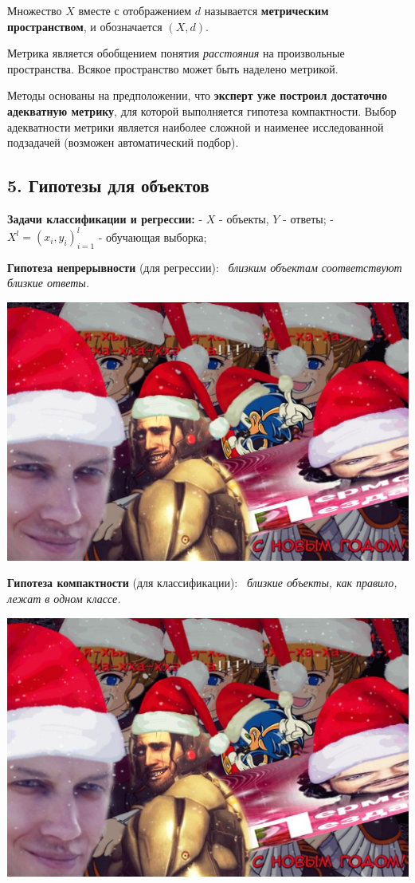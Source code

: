 Множество $X$ вместе с отображением $d$ называется
\textbf{метрическим пространством}, и обозначается $(X, d)$.

Метрика является обобщением понятия \textit{расстояния} на произвольные
пространства.
Всякое пространство может быть наделено метрикой.

Методы основаны на предположении, что \textbf{эксперт уже построил достаточно
адекватную метрику}, для которой выполняется гипотеза компактности.
Выбор адекватности метрики является наиболее сложной и наименее
исследованной подзадачей (возможен автоматический подбор).

\subsection{5. Гипотезы для объектов}

\textbf{Задачи классификации и регрессии:}
- $X$ - объекты, $Y$ - ответы;
- $X^l = {(x_i, y_i)}^l_{i=1}$ - обучающая выборка;

\textbf{Гипотеза непрерывности} (для регрессии):
\
\textit{близким объектам соответствуют близкие ответы.}

\includegraphics[scale=0.3]{figures/samplefigure.jpg}

\textbf{Гипотеза компактности} (для классификации):
\
\textit{близкие объекты, как правило, лежат в одном классе.}

\includegraphics[scale=0.3]{figures/samplefigure.jpg}

